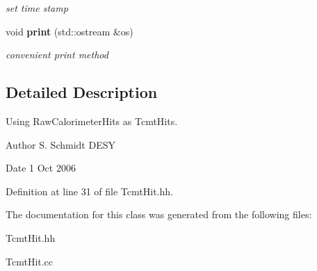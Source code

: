 \begin{DoxyCompactItemize}
\begin{DoxyCompactList}\small\item\em set time stamp \end{DoxyCompactList}\item 
void {\bf print} (std\-::ostream \&os)\label{classCALICE_1_1TcmtHit_a98d3bd8b59170986e7c5126eed9f11a9}

\begin{DoxyCompactList}\small\item\em convenient print method \end{DoxyCompactList}\end{DoxyCompactItemize}


\subsection{Detailed Description}
Using Raw\-Calorimeter\-Hits as Tcmt\-Hits. 

\begin{DoxyAuthor}{Author}
S. Schmidt D\-E\-S\-Y 
\end{DoxyAuthor}
\begin{DoxyDate}{Date}
1 Oct 2006 
\end{DoxyDate}


Definition at line 31 of file Tcmt\-Hit.\-hh.



The documentation for this class was generated from the following files\-:\begin{DoxyCompactItemize}
\item 
Tcmt\-Hit.\-hh\item 
Tcmt\-Hit.\-cc\end{DoxyCompactItemize}
